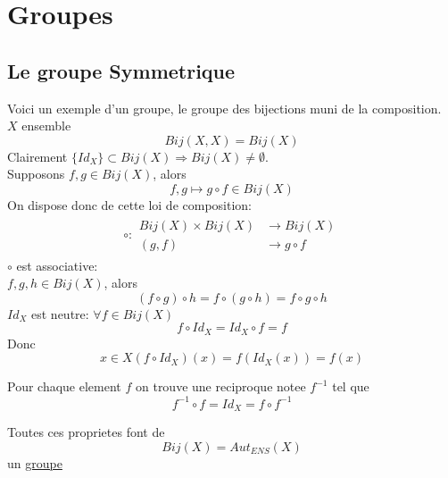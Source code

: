 \documentclass[../main.tex]{subfiles}
\begin{document}
\chapter{Groupes}
\section{Le groupe Symmetrique}
Voici un exemple d'un groupe, le groupe des bijections muni de la composition.\\
$X$ ensemble
\[ 
	Bij(X,X) = Bij(X)
\]
Clairement $\{ Id_X \} \subset Bij(X) \Rightarrow Bij(X) \neq \emptyset $.\\
Supposons $f,g \in Bij(X)$, alors
\[ 
	f,g \mapsto g \circ f \in Bij(X)
\]
On dispose donc de cette loi de composition:
\begin{align*}
\circ: 
\begin{aligned}
	Bij(X) \times Bij(X) &\longrightarrow Bij(X)\\
	( g,f) &\longrightarrow g \circ f
\end{aligned}
\end{align*}
 $\circ$ est associative:\\
 $f,g,h \in Bij(X)$, alors
 \[ 
	 ( f \circ g) \circ h = f \circ ( g \circ h) = f \circ g \circ h
 \]
 $Id_X$ est neutre: $\forall f \in Bij(X)$ 
 \[ 
	 f \circ Id_X = Id_X \circ f = f
 \]
Donc
\[ 
	x \in X (f \circ Id_X)(x) = f(Id_X(x)) = f(x)
\]

Pour chaque element $f$ on trouve une reciproque notee $f^{-1}$ tel que
\[ 
f^{-1} \circ f = Id_X= f \circ f^{-1}
\]

Toutes ces proprietes font de 
\[ 
	Bij(X) = Aut_{ENS}(X)
\]
un \underline{groupe}
\end{document}
